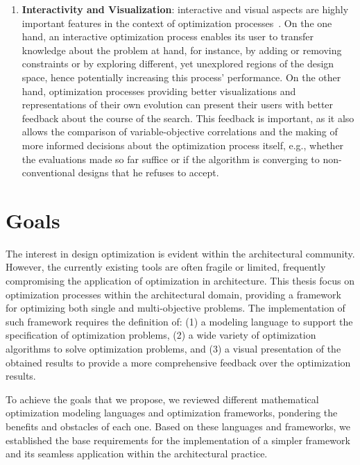 \begin{enumerate}
\item \textbf{Interactivity and Visualization}: interactive and visual aspects are highly important features in the context of optimization processes~\cite{Ashour2015CreativelyMOO}. On the one hand, an interactive optimization process enables its user to transfer knowledge about the problem at hand, for instance, by adding or removing constraints or by exploring different, yet unexplored regions of the design space, hence potentially increasing this process' performance. On the other hand, optimization processes providing better visualizations and representations of their own evolution can present their users with better feedback about the course of the search. This feedback is important, as it also allows the comparison of variable-objective correlations and the making of more informed decisions about the optimization process itself, e.g., whether the evaluations made so far suffice or if the algorithm is converging to non-conventional designs that he refuses to accept.
\end{enumerate}


\section{Goals}
The interest in design optimization is evident within the architectural community. However, the currently existing tools are often fragile or limited, frequently compromising the application of optimization in architecture. This thesis focus on optimization processes within the architectural domain, providing a framework for optimizing both single and multi-objective problems. The implementation of such framework requires the definition of: (1) a modeling language to support the specification of optimization problems, (2) a wide variety of optimization algorithms to solve optimization problems, and (3) a visual presentation of the obtained results to provide a more comprehensive feedback over the optimization results.

To achieve the goals that we propose, we reviewed different mathematical optimization modeling languages and optimization frameworks, pondering the benefits and obstacles of each one. Based on these languages and frameworks, we established the base requirements for the implementation of a simpler framework and its seamless application within the architectural practice. 

